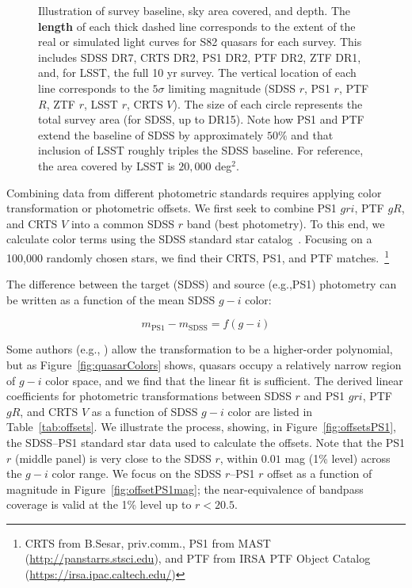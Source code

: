 \documentclass[twocolumn]{aastex62}
\begin{document}
\begin{figure*} 
	\caption{Illustration of survey baseline, sky area covered, and depth. The \textbf{length} of each thick dashed line corresponds to the extent of the real or simulated light curves for S82 quasars for each survey. This includes SDSS DR7, CRTS DR2, PS1 DR2, PTF DR2, ZTF DR1, and, for LSST, the full 10 yr survey. The vertical location of each line corresponds to the $5\sigma$ limiting magnitude (SDSS $r$, PS1 $r$, PTF $R$, ZTF $r$, LSST $r$, CRTS $V$). The size of each circle represents the total survey area (for SDSS, up to DR15).  Note how PS1 and PTF extend the baseline of SDSS by approximately $50\%$ and that inclusion of LSST roughly triples the SDSS baseline. For reference, the area covered by LSST is $20,000$ deg${^2}$.}
	\label{fig:lc_extent}
\end{figure*} 


Combining data from different photometric standards requires applying color transformation or photometric offsets. We first seek to combine PS1 $gri$,  PTF $gR$, and CRTS $V$ into a common SDSS $r$ band (best photometry). To this end, we calculate  color terms using the SDSS standard star catalog~\citep{ivezic2007}. Focusing on a 100,000 randomly chosen stars, we find their CRTS, PS1, and PTF matches.~\footnote{CRTS from B.Sesar, priv.comm., PS1 from MAST (\url{http://panstarrs.stsci.edu}), and PTF from IRSA PTF Object Catalog (\url{https://irsa.ipac.caltech.edu/})}

The difference  between the target (SDSS) and source (e.g.,PS1) photometry can be written as a function of the mean SDSS $g-i$ color: 

\begin{equation}
m_{\mathrm{PS1}} - m_{\mathrm{SDSS}} = f(g-i)
\end{equation}

Some authors (e.g., \citealt{li2018}) allow the transformation to be a higher-order polynomial, but as Figure~\ref{fig:quasarColors} shows, quasars occupy a relatively narrow region of $g-i$ color space, and we find that the linear fit is sufficient. The derived linear coefficients for photometric transformations between SDSS $r$ and PS1 $gri$, PTF $gR$, and CRTS $V$ as a function of SDSS $g-i$ color are listed in Table~\ref{tab:offsets}. We illustrate the process, showing, in Figure~\ref{fig:offsetsPS1}, the SDSS--PS1 standard star data used to calculate the offsets. Note that the PS1 $r$ (middle panel) is very close to the SDSS $r$, within  $0.01$ mag (1\% level) across the $g-i$ color range. We focus on the SDSS $r$--PS1 $r$ offset as a function of magnitude in Figure~\ref{fig:offsetPS1mag}; the near-equivalence of bandpass coverage is valid at the 1\% level up to $r < 20.5$.  
\end{document}
